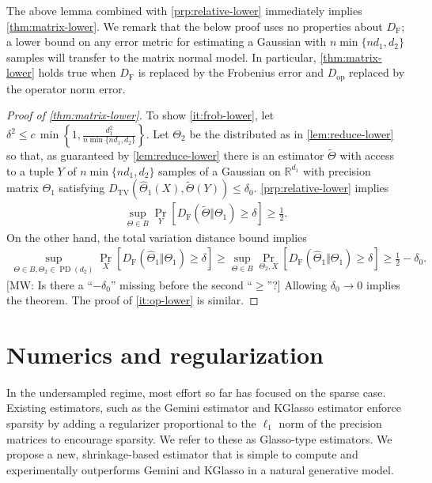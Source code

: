 \documentclass[aos]{imsart}
\theoremstyle{definition}
\numberwithin{equation}{section}
\DeclareMathOperator{\PD}{PD}
\newcommand{\R}{{\mathbb{R}}}
\newcommand{\htheta}{\widehat{\Theta}}
\newcommand{\DF}{D_{\operatorname{F}}}
\newcommand{\Dop}{D_{\operatorname{op}}}
\newcommand{\DTV}{D_{\operatorname{TV}}}
\newcommand{\CF}[1]{{\color{purple}[CF: #1]}}
\newcommand{\MW}[1]{{\color{red}[MW: #1]}}
\newcommand{\CF}[1]{{}}
\newcommand{\MW}[1]{{}}
\begin{document}
The above lemma combined with \cref{prp:relative-lower} immediately implies \cref{thm:matrix-lower}. We remark that the below proof uses no properties about $\DF$; a lower bound on any error metric for estimating a Gaussian with $n \min \{n d_1, d_2\}$ samples will transfer to the matrix normal model. In particular, \cref{thm:matrix-lower} holds true when $\DF$ is replaced by the Frobenius error and $\Dop$ replaced by the operator norm error.
\begin{proof}[Proof of \cref{thm:matrix-lower}]

To show \cref{it:frob-lower}, let $\delta^2 \leq c \, \min \left\{1,\frac{d_1^2}{n \min \{n d_1, d_2\}}\right\}$. Let $\Theta_2$ be the distributed as in \cref{lem:reduce-lower} so that, as guaranteed by \cref{lem:reduce-lower} there is an estimator $\tilde{\Theta}$ with access to a tuple $Y$ of $n \min \{n d_1, d_2\}$ samples of a Gaussian on $\R^{d_1}$ with precision matrix $\Theta_1$ satisfying $\DTV (\htheta_1(X), \tilde{\Theta}(Y)) \leq \delta_0$. \cref{prp:relative-lower} implies \begin{align*}
\sup_{\Theta \in B} \Pr_Y\left[ \DF(\tilde{\Theta}\Vert  \Theta_1)  \geq \delta\right] \geq \frac{1}{2}.
\end{align*}
On the other hand, the total variation distance bound implies
\begin{align*}
\sup_{\Theta \in B, \Theta_2 \in \PD(d_2)} \Pr_{X}
\left[ \DF(\htheta_1\Vert  \Theta_1) \geq \delta \right]
\geq \sup_{\Theta \in B} \Pr_{\Theta_2, X}\left[ \DF(\htheta_1\Vert  \Theta_1)  \geq \delta\right]
\geq \frac{1}{2} - \delta_0.
\end{align*}
\MW{Is there a ``$-\delta_0$'' missing before the second ``$\geq$''?}
Allowing $\delta_0 \to 0$ implies the theorem. The proof of \cref{it:op-lower} is similar.
\end{proof}



\section{Numerics and regularization}\label{sec:numerics}

In the undersampled regime, most effort so far has focused on the sparse case.
Existing estimators, such as the Gemini estimator \cite{zhou2014gemini} and KGlasso estimator \cite{tsiligkaridis2013convergence} enforce sparsity by adding a regularizer proportional to the $\ell_1$ norm of the precision matrices to encourage sparsity.
We refer to these as Glasso-type estimators.
We propose a new, shrinkage-based estimator that is simple to compute and experimentally outperforms Gemini and KGlasso in a natural generative model.
\end{document}
